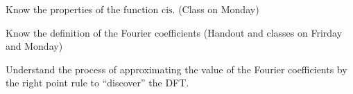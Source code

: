 \documentclass[12pt,fleqn,answers]{exam}
\begin{document}
\begin{questions}
\item Know the properties of the function $\mathrm{cis}$. (Class on Monday)

\item Know the definition of the Fourier coefficients (Handout and classes on Frirday and Monday)

\item Understand the process of approximating the value of the  Fourier coefficients by the right point rule to ``discover''
the DFT.

\end{questions}
\end{document}
